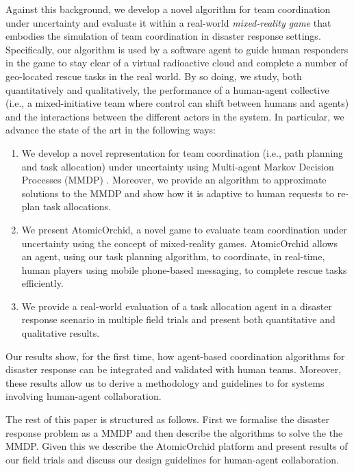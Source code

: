 Against this background, we develop a novel algorithm for team coordination under uncertainty and evaluate it within a real-world \emph{mixed-reality game} \cite{} that embodies the simulation of team coordination in disaster response settings. Specifically, our algorithm is used by a software agent to guide human responders in the game to stay clear of a virtual radioactive cloud and complete a number of geo-located rescue tasks in the real world. By so doing, we  study, both quantitatively and qualitatively, the performance of a human-agent collective (i.e., a mixed-initiative team where control can shift between humans and agents)  and the interactions between the different actors in the system. In particular, we  advance the state of the art in the following ways:
\begin{enumerate}
\item We develop a novel representation for team coordination (i.e., path planning and task allocation) under uncertainty using Multi-agent Markov Decision Processes (MMDP)  \cite{boutilier1996planning}. Moreover, we provide an algorithm to approximate solutions to the MMDP and show how it  is adaptive to human requests to re-plan task allocations.
\item We present AtomicOrchid, a novel game to evaluate team coordination under uncertainty using the concept of mixed-reality games. AtomicOrchid allows an agent, using our task planning algorithm, to coordinate, in real-time, human players using mobile phone-based messaging, to complete rescue tasks efficiently.
\item We provide a real-world evaluation of a task allocation agent in a disaster response scenario in multiple field trials and present both quantitative and qualitative results. 
\end{enumerate}
Our results show, for the first time, how agent-based coordination algorithms for disaster response can be integrated and validated with human teams. Moreover, these results allow us to derive a methodology and guidelines to for systems involving  human-agent collaboration. 

The rest of this paper is structured as follows. First we  formalise the disaster response problem as a MMDP and then describe the algorithms to solve the the MMDP. Given this we describe the AtomicOrchid platform and present results of our field trials and discuss our design guidelines for human-agent collaboration.




